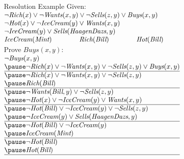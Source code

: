 \documentclass[14pt]{beamer}
\begin{document}
\begin{frame}[label=resolution-example]{Resolution Example}
\footnotesize
Given:\\
\tab$
\begin{array}{ @{} l @{\hspace{4em}} l @{\hspace{4em}} l @{} }
\lefteqn{\lnot\textit{Rich}(x) \lor \lnot\textit{Wants}(x, y) \lor \lnot\textit{Sells}(z, y) \lor \textit{Buys}(x, y)} \\
\lefteqn{\lnot\textit{Hot}(x) \lor \lnot\textit{IceCream}(y) \lor \textit{Wants}(x, y)} \\
\lefteqn{\lnot\textit{IceCream}(y) \lor \textit{Sells}(\textit{HaagenDazs}, y)} \\
\textit{IceCream}(\textit{Mint})
& \textit{Rich}(\textit{Bill})
& \textit{Hot}(\textit{Bill})
\end{array}
$
\\[0.5em]
Prove $\textit{Buys}(x, y)$:\\
\pause
\tab$
\begin{array}{ @{} l @{} }
\lnot\textit{Buys}(x, y) \\
\pause
\lnot\textit{Rich}(x) \lor \lnot\textit{Wants}(x, y) \lor \lnot\textit{Sells}(z, y) \lor \textit{Buys}(x, y) \\
\hline
\pause
\lnot\textit{Rich}(x) \lor \lnot\textit{Wants}(x, y) \lor \lnot\textit{Sells}(z, y)\\
\pause
\textit{Rich}(\textit{Bill}) \\
\hline
\pause
\lnot\textit{Wants}(\textit{Bill}, y) \lor \lnot\textit{Sells}(z, y) \\
\pause
\lnot\textit{Hot}(x) \lor \lnot\textit{IceCream}(y) \lor \textit{Wants}(x, y) \\
\hline
\pause
\lnot\textit{Hot}(\textit{Bill}) \lor \lnot\textit{IceCream}(y) \lor \lnot\textit{Sells}(z, y) \\
\pause
\lnot\textit{IceCream}(y) \lor \textit{Sells}(\textit{HaagenDazs}, y) \\
\hline
\pause
\lnot\textit{Hot}(\textit{Bill}) \lor \lnot\textit{IceCream}(y) \\
\pause
\textit{IceCream}(\textit{Mint}) \\
\hline
\pause
\lnot\textit{Hot}(\textit{Bill}) \\
\pause
\textit{Hot}(\textit{Bill}) \\
\hline
\end{array}
$
\end{frame}
\end{document}
